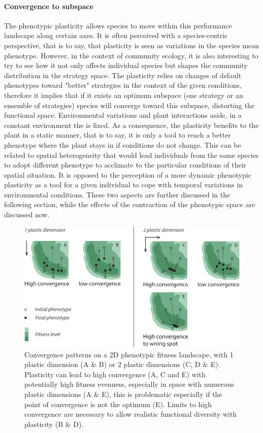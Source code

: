 \paragraph{Convergence to subspace}

The phenotypic plasticity allows species to move within this performance landscape along certain axes. It is often perceived with a species-centric perspective, that is to say, that plasticity is seen as variations in the species mean phenotype. However, in the context of community ecology, it is also interesting to try to see how it not only affects individual species but shapes the community distribution in the strategy space. The plasticity relies on changes of default phenotypes toward "better" strategies in the context of the given conditions, therefore it implies that if it exists an optimum subspace (one strategy or an ensemble of strategies) species will converge toward this subspace, distorting the functional space. Environmental variations and plant interactions aside, in a constant environment the  is fixed. As a consequence, the plasticity benefits to the plant in a static manner, that is to say, it is only a tool to reach a better phenotype where the plant stays in if conditions do not change. This can be related to spatial heterogeneity that would lead individuals from the same species to adopt different phenotype to acclimate to the particular conditions of their spatial situation. It is opposed to the perception of a more dynamic phenotypic plasticity as a tool for a given individual to cope with temporal variations in environmental conditions. These two aspects are further discussed in the following section, while the effects of the contraction of the phenotypic space are discussed now.

\begin{figure}\label{fig:convergence}
\includegraphics[width = \textwidth]{./2_PP/Figures/Landscape/ld_convergence.pdf}
\caption[Convergence patterns]{Convergence patterns on a 2D phenotypic fitness landscape, with 1 plastic dimension (A \& B) or 2 plastic dimensions (C, D \& E). Plasticity can lead to high convergence (A, C and E) with potentially high fitness evenness, especially in space with numerous plastic dimensions (A \& E), this is problematic especially if the point of convergence is not the optimum (E). Limits to high convergence are necessary to allow realistic functional diversity with plasticity (B \& D).}
\end{figure}


